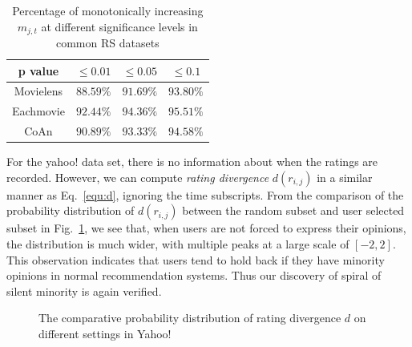 \documentclass[sigconf]{acmart}
\begin{document}
\begin{table}[htp]
\caption{Percentage of monotonically increasing $m_{j,t}$ at different significance levels in common RS datasets}
\small
\begin{center}
\begin{tabular}{|c|c|c|c|}
\hline
p value & $\leq0.01$ &  $\leq0.05$   & $\leq0.1$\\\hline  
\hline
Movielens & $88.59\%$ & $91.69\%$       &         $93.80\%$\\\hline
Eachmovie & $92.44\%$   &   $94.36\%$     &      $95.51\%$\\\hline
CoAn &  $90.89\%$&                $93.33 \%$   &            $94.58\%$\\\hline
\end{tabular}\label{tab:MK}
\end{center}
\label{default}
\end{table}%

For the yahoo! data set, there is no information about when the ratings are recorded. However, we can compute \emph{rating divergence} $d(r_{i,j})$ in a similar manner as Eq.~\ref{equ:d}, ignoring the time subscripts. From the comparison of the probability distribution of $d(r_{i,j})$ between the random subset and user selected subset in Fig.~\ref{fig:yahoo}, we see that, when users are not forced to express their opinions, the distribution is much wider, with multiple peaks at a large scale of $[-2,2]$. This observation indicates that users tend to hold back if they have minority opinions in normal recommendation systems. Thus our discovery of spiral of silent minority is again verified.

\begin{figure}[htbp]
\centering
\centering
{}
\caption{The comparative probability distribution of rating divergence $d$ on different settings in Yahoo!}\label{fig:yahoo}
\end{figure}
\end{document}
